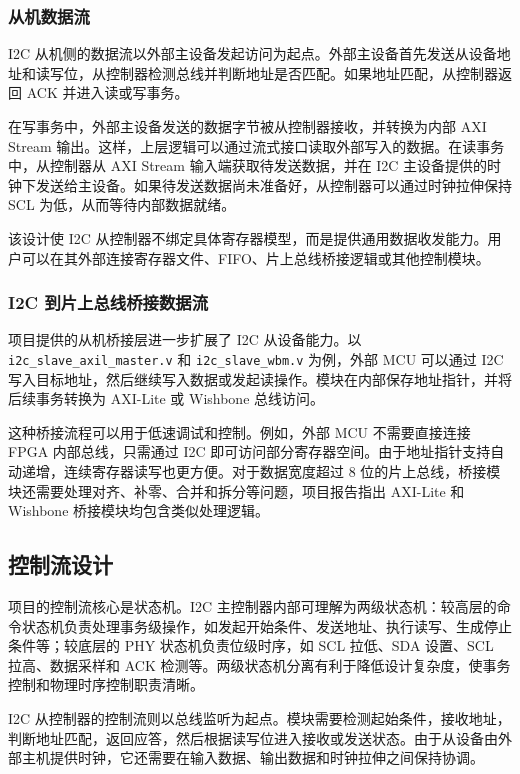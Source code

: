 \documentclass[12pt,a4paper]{article}
\numberwithin{equation}{section}
\begin{document}
\subsubsection{从机数据流}

I2C 从机侧的数据流以外部主设备发起访问为起点。外部主设备首先发送从设备地址和读写位，从控制器检测总线并判断地址是否匹配。如果地址匹配，从控制器返回 ACK 并进入读或写事务。

在写事务中，外部主设备发送的数据字节被从控制器接收，并转换为内部 AXI Stream 输出。这样，上层逻辑可以通过流式接口读取外部写入的数据。在读事务中，从控制器从 AXI Stream 输入端获取待发送数据，并在 I2C 主设备提供的时钟下发送给主设备。如果待发送数据尚未准备好，从控制器可以通过时钟拉伸保持 SCL 为低，从而等待内部数据就绪。

该设计使 I2C 从控制器不绑定具体寄存器模型，而是提供通用数据收发能力。用户可以在其外部连接寄存器文件、FIFO、片上总线桥接逻辑或其他控制模块。

\subsubsection{I2C 到片上总线桥接数据流}

项目提供的从机桥接层进一步扩展了 I2C 从设备能力。以 \texttt{i2c\_slave\_axil\_master.v} 和 \texttt{i2c\_slave\_wbm.v} 为例，外部 MCU 可以通过 I2C 写入目标地址，然后继续写入数据或发起读操作。模块在内部保存地址指针，并将后续事务转换为 AXI-Lite 或 Wishbone 总线访问。

这种桥接流程可以用于低速调试和控制。例如，外部 MCU 不需要直接连接 FPGA 内部总线，只需通过 I2C 即可访问部分寄存器空间。由于地址指针支持自动递增，连续寄存器读写也更方便。对于数据宽度超过 8 位的片上总线，桥接模块还需要处理对齐、补零、合并和拆分等问题，项目报告指出 AXI-Lite 和 Wishbone 桥接模块均包含类似处理逻辑。

\subsection{控制流设计}

项目的控制流核心是状态机。I2C 主控制器内部可理解为两级状态机：较高层的命令状态机负责处理事务级操作，如发起开始条件、发送地址、执行读写、生成停止条件等；较底层的 PHY 状态机负责位级时序，如 SCL 拉低、SDA 设置、SCL 拉高、数据采样和 ACK 检测等。两级状态机分离有利于降低设计复杂度，使事务控制和物理时序控制职责清晰。

I2C 从控制器的控制流则以总线监听为起点。模块需要检测起始条件，接收地址，判断地址匹配，返回应答，然后根据读写位进入接收或发送状态。由于从设备由外部主机提供时钟，它还需要在输入数据、输出数据和时钟拉伸之间保持协调。
\end{document}
